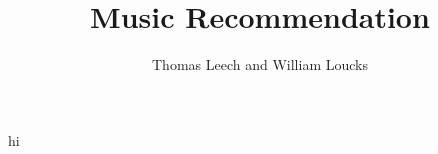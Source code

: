 \documentclass[11pt]{article}
\theoremstyle{plain}
\theoremstyle{definition}
\begin{document}
   	
   	\title{ Music Recommendation }
   	\author{ Thomas Leech and William Loucks }
   	\maketitle
   	hi
   	
   	
   	
   	
   		
   
\end{document}

